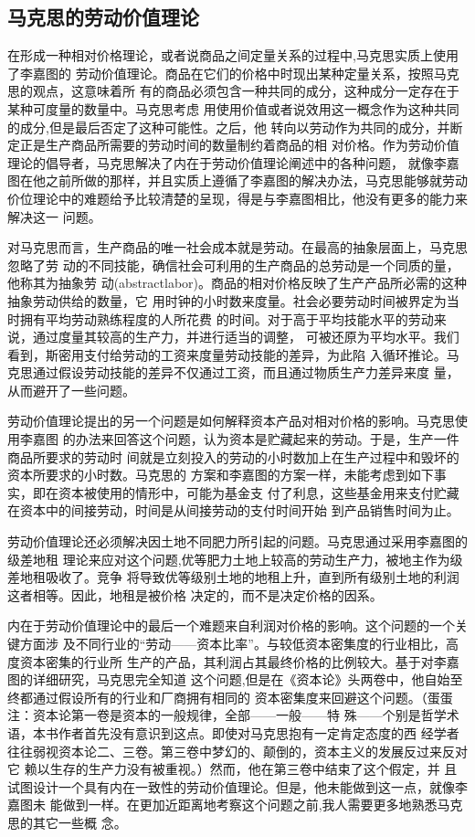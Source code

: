 \subsection{马克思的劳动价值理论}

在形成一种相对价格理论，或者说商品之间定量关系的过程中,马克思实质上使用了李嘉图的
劳动价值理论。商品在它们的价格中时现出某种定量关系，按照马克思的观点，这意味着所
有的商品必须包含一种共同的成分，这种成分一定存在于某种可度量的数量中。马克思考虑
用使用价值或者说效用这一概念作为这种共同的成分,但是最后否定了这种可能性。之后，他
转向以劳动作为共同的成分，并断定正是生产商品所需要的劳动时间的数量制约着商品的相
对价格。作为劳动价值理论的倡导者，马克思解决了内在于劳动价值理论阐述中的各种问题，
就像李嘉图在他之前所做的那样，并且实质上遵循了李嘉图的解决办法，马克思能够就劳动
价位理论中的难题给予比较清楚的呈现，得是与李嘉图相比，他没有更多的能力来解决这一
问题。

对马克思而言，生产商品的唯一社会成本就是劳动。在最高的抽象层面上，马克思忽略了劳
动的不同技能，确信社会可利用的生产商品的总劳动是一个同质的量，他称其为抽象劳
动(abstractlabor)。商品的相对价格反映了生产产品所必需的这种抽象劳动供给的数量，它
用时钟的小时数来度量。社会必要劳动时间被界定为当时拥有平均劳动熟练程度的人所花费
的时间。对于高于平均技能水平的劳动来说，通过度量其较高的生产力，并进行适当的调整，
可被还原为平均水平。我们看到，斯密用支付给劳动的工资来度量劳动技能的差异，为此陷
入循环推论。马克思通过假设劳动技能的差异不仅通过工资，而且通过物质生产力差异来度
量，从而避开了一些问题。

劳动价值理论提出的另一个问题是如何解释资本产品对相对价格的影响。马克思使用李嘉图
的办法来回答这个问题，认为资本是贮藏起来的劳动。于是，生产一件商品所要求的劳动时
间就是立刻投入的劳动的小时数加上在生产过程中和毁坏的资本所要求的小时数。马克思的
方案和李嘉图的方案一样，未能考虑到如下事实，即在资本被使用的情形中，可能为基金支
付了利息，这些基金用来支付贮藏在资本中的间接劳动，时间是从间接劳动的支付时间开始
到产品销售时间为止。

劳动价值理论还必须解决因土地不同肥力所引起的问题。马克思通过采用李嘉图的级差地租
理论来应对这个问题,优等肥力土地上较高的劳动生产力，被地主作为级差地租吸收了。竞争
将导致优等级别土地的地租上升，直到所有级别土地的利润这者相等。因此，地租是被价格
决定的，而不是决定价格的因系。

内在于劳动价值理论中的最后一个难题来自利润对价格的影响。这个问题的一个关键方面涉
及不同行业的“劳动——资本比率”。与较低资本密集度的行业相比，高度资本密集的行业所
生产的产品，其利润占其最终价格的比例较大。基于对李嘉图的详细研究，马克思完全知道
这个问题,但是在《资本论》头两卷中，他自始至终都通过假设所有的行业和厂商拥有相同的
资本密集度来回避这个问题。（蛋蛋注：资本论第一卷是资本的一般规律，全部——一般——特
殊——个别是哲学术语，本书作者首先没有意识到这点。即使对马克思抱有一定肯定态度的西
经学者往往弱视资本论二、三卷。第三卷中梦幻的、颠倒的，资本主义的发展反过来反对它
赖以生存的生产力没有被重视。）然而，他在第三卷中结束了这个假定，并
且试图设计一个具有内在一致性的劳动价值理论。但是，他未能做到这一点，就像李嘉图未
能做到一样。在更加近距离地考察这个问题之前,我人需要更多地熟悉马克思的其它一些概
念。


